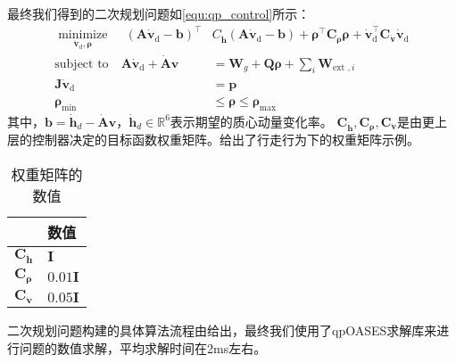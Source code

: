 最终我们得到的二次规划问题如\ref{equ:qp_control}所示：
\begin{equation}
    \label{equ:qp_control}
    \begin{aligned}
       \underset{{{{\dot{\boldsymbol{v}}}}_{\text{d}}},\boldsymbol{\rho}}{\mathop{\operatorname{minimize}}}\,\quad {{\left( \boldsymbol{A}{{{\dot{\boldsymbol{v}}}}_{\text{d}}}-\boldsymbol{b} \right)}^{\top }}&{{C}_{{\dot{\boldsymbol{h}}}}}\left( \boldsymbol{A}{{{\dot{\boldsymbol{v}}}}_{\text{d}}}-\boldsymbol{b} \right)+{{\boldsymbol{\rho} }^{\top }}{{\boldsymbol{C}}_{\boldsymbol{\rho} }}\boldsymbol{\rho} +\dot{\boldsymbol{v}}_{\text{d}}^{\top }{{\boldsymbol{C}}_{{\dot{\boldsymbol{v}}}}}{{{\dot{\boldsymbol{v}}}}_{\text{d}}} \\ 
        \text{subject to}\quad \boldsymbol{A}{{{\dot{\boldsymbol{v}}}}_{\text{d}}}+\dot{\boldsymbol{A}}\boldsymbol{v}&={\boldsymbol{{}W}_{g}}+\boldsymbol{Q}\boldsymbol{\rho} +\sum\limits_{i}{{{\boldsymbol{W}}_{\text{ext },i}}} \\ 
        \boldsymbol{J}{{{\dot{\boldsymbol{v}}}}_{\text{d}}}&=\boldsymbol{p} \\ 
        {{\boldsymbol{\rho} }_{\min }}&\le \boldsymbol{\rho} \le {{\boldsymbol{\rho} }_{\max }} 
      \end{aligned}
\end{equation}
其中，$\boldsymbol{b}={{\dot{\boldsymbol{h}}}_{d}}-\dot{\boldsymbol{A}}\boldsymbol{v}$，${{\dot{\boldsymbol{h}}}_{d}}\in {{\mathbb{R}}^{6}}$表示期望的质心动量变化率。
${{\boldsymbol{C}}_{{\dot{\boldsymbol{h}}}}},{\boldsymbol{{C}}_{\boldsymbol{\rho} }},{\boldsymbol{C}_{{\dot{\boldsymbol{v}}}}}$是由更上层的控制器决定的目标函数权重矩阵。给出了行走行为下的权重矩阵示例。
\begin{table}[htbp]
	\centering
	\caption{权重矩阵的数值}
	\label{tab:qp_weight}
	\begin{tabular}{m{2cm}<{\centering}m{2cm}<{\centering}}
		\toprule  %
		\fangsong{参数名称}   &数值  \\
		\midrule  %
		${{\boldsymbol{C}}_{{\dot{\boldsymbol{h}}}}}$    & $\mathbf{I}$\\
		${\boldsymbol{{C}}_{\boldsymbol{\rho} }}$ &  $0.01 \mathbf{I}$ \\
		${\boldsymbol{C}_{{\dot{\boldsymbol{v}}}}}$ & $0.05 \mathbf{I}$ \\
		\bottomrule %
	\end{tabular}
\end{table}
二次规划问题构建的具体算法流程由给出，最终我们使用了qpOASES求解库来进行问题的数值求解，平均求解时间在2ms左右。
